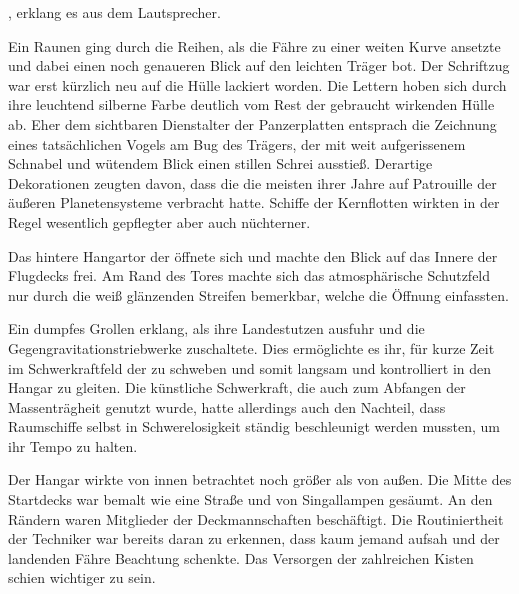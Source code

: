 \par

, erklang es aus dem Lautsprecher.

\par

Ein Raunen ging durch die Reihen, als die Fähre zu einer weiten Kurve ansetzte und dabei einen noch genaueren Blick auf den leichten Träger bot. Der Schriftzug  war erst kürzlich neu auf die Hülle lackiert worden. Die Lettern hoben sich durch ihre leuchtend silberne Farbe deutlich vom Rest der gebraucht wirkenden Hülle ab. Eher dem sichtbaren Dienstalter der Panzerplatten entsprach die Zeichnung eines tatsächlichen Vogels am Bug des Trägers, der mit weit aufgerissenem Schnabel und wütendem Blick einen stillen Schrei ausstieß. Derartige Dekorationen zeugten davon, dass die  die meisten ihrer Jahre auf Patrouille der äußeren Planetensysteme verbracht hatte. Schiffe der Kernflotten wirkten in der Regel wesentlich gepflegter aber auch nüchterner.

\par

Das hintere Hangartor der  öffnete sich und machte den Blick auf das Innere der Flugdecks frei. Am Rand des Tores machte sich das atmosphärische Schutzfeld nur durch die weiß glänzenden Streifen bemerkbar, welche die Öffnung einfassten.

\par

Ein dumpfes Grollen erklang, als  ihre Landestutzen ausfuhr und die Gegengravitationstriebwerke zuschaltete. Dies ermöglichte es ihr, für kurze Zeit im Schwerkraftfeld der  zu schweben und somit langsam und kontrolliert in den Hangar zu gleiten. Die künstliche Schwerkraft, die auch zum Abfangen der Massenträgheit genutzt wurde, hatte allerdings auch den Nachteil, dass Raumschiffe selbst in Schwerelosigkeit ständig beschleunigt werden mussten, um ihr Tempo zu halten.

\par

Der Hangar wirkte von innen betrachtet noch größer als von außen. Die Mitte des Startdecks war bemalt wie eine Straße und von Singallampen gesäumt. An den Rändern waren Mitglieder der Deckmannschaften beschäftigt. Die Routiniertheit der Techniker war bereits daran zu erkennen, dass kaum jemand aufsah und der landenden Fähre Beachtung schenkte. Das Versorgen der zahlreichen Kisten schien wichtiger zu sein.

